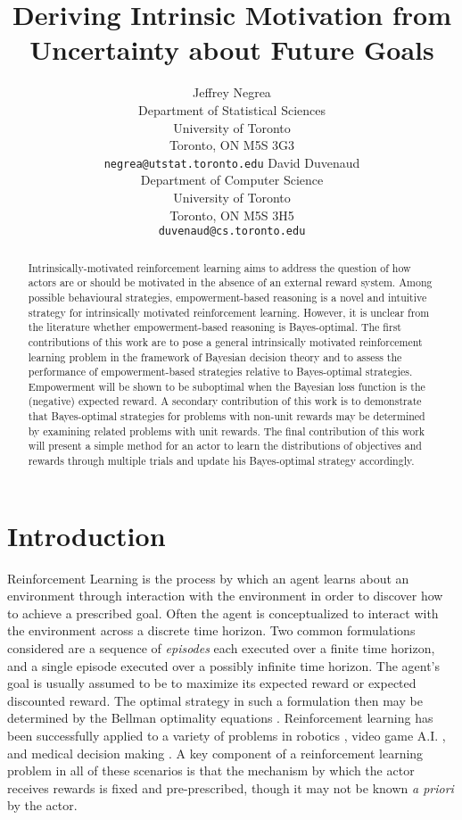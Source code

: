 \documentclass{article}
\title{Deriving Intrinsic Motivation from \\ Uncertainty about Future Goals}
\author{
 Jeffrey Negrea\\
 Department of Statistical Sciences\\
 University of Toronto\\
 Toronto, ON M5S 3G3\\
 \texttt{negrea@utstat.toronto.edu}
 \And
 David Duvenaud\\
 Department of Computer Science\\
 University of Toronto\\
 Toronto, ON M5S 3H5\\
 \texttt{duvenaud@cs.toronto.edu}
}
\begin{document}
\maketitle

\begin{abstract}
Intrinsically-motivated reinforcement learning aims to address the question of how actors are or should be motivated in the absence of an external reward system. 
Among possible behavioural strategies, empowerment-based reasoning is a novel and intuitive strategy for intrinsically motivated reinforcement learning. 
However, it is unclear from the literature whether empowerment-based reasoning is Bayes-optimal.
The first contributions of this work are to pose a general intrinsically motivated reinforcement learning problem in the framework of Bayesian decision theory and to assess the performance of empowerment-based strategies relative to Bayes-optimal strategies. 
Empowerment will be shown to be suboptimal when the Bayesian loss function is the (negative) expected reward. 
A secondary contribution of this work is to demonstrate that Bayes-optimal strategies  for problems with non-unit rewards may be determined by examining related problems with unit rewards.  The final contribution of this work will present a simple method for an actor to learn the distributions of objectives and rewards through multiple trials and update his Bayes-optimal strategy accordingly. 
\end{abstract}

\section{Introduction}
Reinforcement Learning is the process by which an agent learns about an environment through interaction with the environment in order to discover how to achieve a prescribed goal. Often the agent is conceptualized to interact with the environment across a discrete time horizon. Two common formulations considered are a sequence of \textit{episodes} each executed over a finite time horizon, and a single episode executed over a possibly infinite time horizon. The agent's goal is usually assumed to be to maximize its expected reward or expected discounted reward. The optimal strategy in such a formulation then may be determined by the Bellman optimality equations \cite{sutton1998reinforcement}. Reinforcement learning has been successfully applied to a variety of problems in robotics \cite{mcallister2016data,finn2016deep,christiano2016transfer}, video game A.I. \cite{mnih2015human}, and medical decision making \cite{krishnan2016structured}. A key component of a reinforcement learning problem in all of these scenarios is that the mechanism by which the actor receives rewards is fixed and pre-prescribed, though it may not be known \textit{a priori} by the actor.
\end{document}
